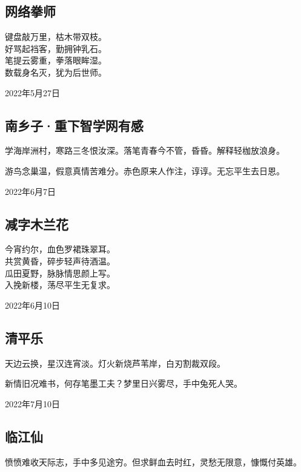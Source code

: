 \documentclass[a5paper]{ctexart}
\begin{document}
	\subsection{网络拳师}
	\begin{center}
		键盘敲万里，枯木带双枝。\\
		好骂起裆客，勤拥钟乳石。\\
		笔提云雾重，拳落眼眸湿。\\
		数载身名灭，犹为后世师。
	\end{center}
	\hfill 2022年5月27日
	
	\subsection{南乡子·重下智学网有感}
	学海岸洲村，寒路三冬恨汝深。落笔青春今不管，昏昏。解释轻枷放浪身。
	
	游鸟念巢温，假意真情苦难分。赤色原来人作注，谆谆。无忘平生去日恩。
	\begin{flushright}
		2022年6月7日
	\end{flushright}
	
	\subsection[减字木兰花（今宵约尔）]{减字木兰花}
	\begin{center}
		今宵约尔，血色罗裙珠翠耳。\\
		共赏黄昏，碎步轻声待酒温。\\
		瓜田夏野，脉脉情思颜上写。\\
		入挽新楼，荡尽平生无复求。
	\end{center}
	\hfill 2022年6月10日
	
	\subsection[清平乐（天边云换）]{清平乐}
	天边云换，星汉连宵淡。灯火新烧芦苇岸，白刃割裁双段。
	
	新情旧况难书，何存笔墨工夫？梦里日兴雾尽，手中兔死人哭。
	\begin{flushright}
		2022年7月10日
	\end{flushright}
	
	\subsection[临江仙（愤愤难收天际志）]{临江仙}
	愤愤难收天际志，手中多见途穷。但求鲜血去时红，灵愁无限意，慷慨付英雄。
	
\end{document}
